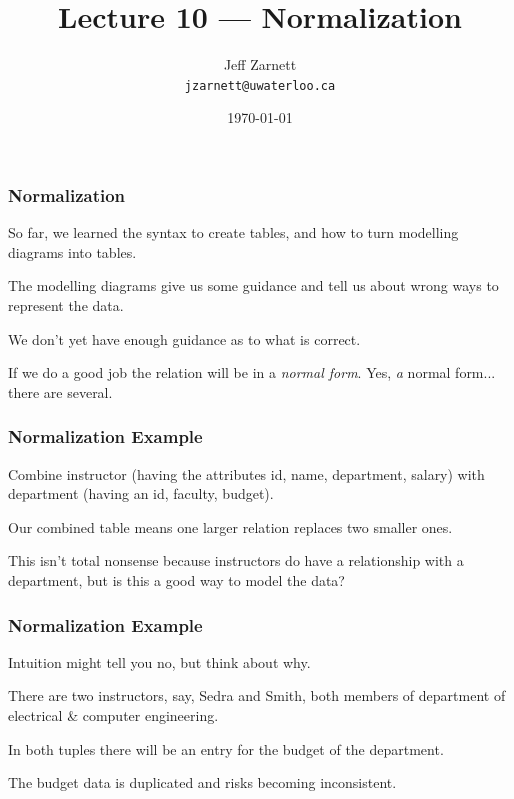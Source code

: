 

\title{Lecture 10 --- Normalization }

\author{Jeff Zarnett \\ \small \texttt{jzarnett@uwaterloo.ca}}
\date{\today}




\begin{frame}
  \titlepage

 \end{frame}



\begin{frame}
\frametitle{Normalization}

So far, we learned the syntax to create tables, and how to turn modelling diagrams into tables. 

The modelling diagrams give us some guidance and tell us about wrong ways to represent the data.

We don't yet have enough guidance as to what is correct. 

If we do a good job the relation will be in a \textit{normal form}. Yes, \textit{a} normal form... there are several.

\end{frame}



\begin{frame}
\frametitle{Normalization Example}

Combine instructor (having the attributes id, name, department, salary) with department (having an id, faculty, budget).

Our combined table means one larger relation replaces two smaller ones.

This isn't total nonsense because instructors do have a relationship with a department, but is this a good way to model the data?

\end{frame}



\begin{frame}
\frametitle{Normalization Example}

Intuition might tell you no, but think about why. 

There are two instructors, say, Sedra and Smith, both members of department of electrical \& computer engineering. 

In both tuples there will be an entry for the budget of the department. 

The budget data is duplicated and risks becoming inconsistent.

\end{frame}

